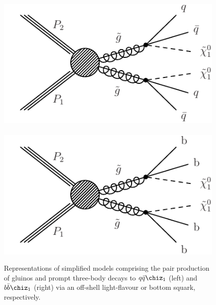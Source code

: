 \begin{figure}[thb]
\centering
\includegraphics[width=0.35\linewidth]{T1qqqq_feyn.pdf} \,
\includegraphics[width=0.35\linewidth]{T1bbbb_feyn.pdf}
\caption{Representations of simplified models comprising the pair
  production of gluinos and prompt three-body decays to
  $q\bar{q}\chiz_{1}$ (left) and $b\bar{b}\chiz_{1}$ (right) via an
  off-shell light-flavour or bottom squark, respectively.}
\label{fig:feyn}
\end{figure}


